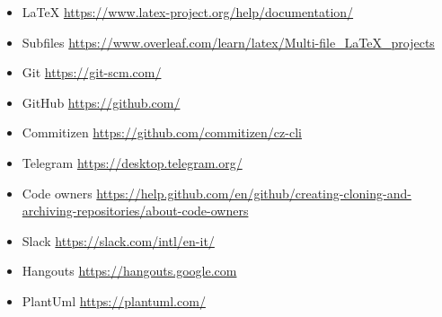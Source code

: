 \documentclass[../norme-di-progetto.tex]{subfiles}
\begin{document}
\begin{itemize}
  \item LaTeX
        \newline \url{https://www.latex-project.org/help/documentation/}
  \item Subfiles
        \newline \url{https://www.overleaf.com/learn/latex/Multi-file_LaTeX_projects}
  \item Git
        \newline \url{https://git-scm.com/}
  \item GitHub
        \newline \url{https://github.com/}
  \item Commitizen
        \newline \url{https://github.com/commitizen/cz-cli}
  \item Telegram
        \newline \url{https://desktop.telegram.org/}
  \item Code owners
        \newline \url{https://help.github.com/en/github/creating-cloning-and-archiving-repositories/about-code-owners}
  \item Slack
        \newline \url{https://slack.com/intl/en-it/}
  \item Hangouts
        \newline \url{https://hangouts.google.com}
  \item PlantUml
        \newline \url{https://plantuml.com/}
\end{itemize}
\end{document}
